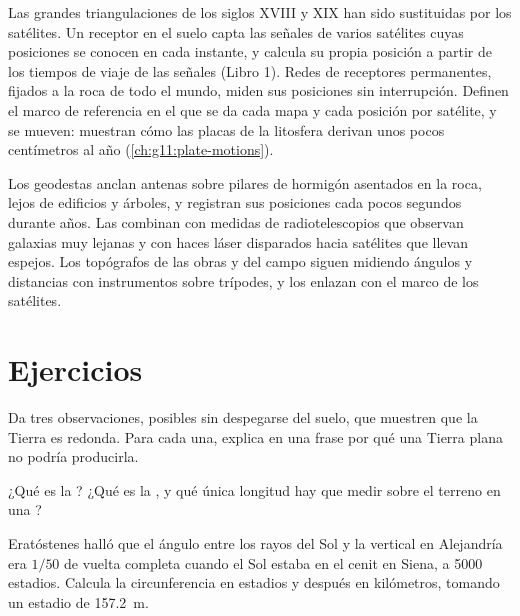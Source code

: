Las grandes triangulaciones de los siglos XVIII y XIX han sido sustituidas
por los satélites. Un receptor en el suelo capta las señales de varios
satélites cuyas posiciones se conocen en cada instante, y calcula su propia
posición a partir de los tiempos de viaje de las señales (Libro 1). Redes de
receptores permanentes, fijados a la roca de todo el mundo, miden sus
posiciones sin interrupción. Definen el marco de referencia en el que se da
cada mapa y cada posición por satélite, y se mueven: muestran cómo las
placas de la litosfera derivan unos pocos centímetros al año
(\cref{ch:g11:plate-motions}).

\begin{inthefield}
Los geodestas anclan antenas sobre pilares de hormigón asentados en la roca,
lejos de edificios y árboles, y registran sus posiciones cada pocos segundos
durante años. Las combinan con medidas de radiotelescopios que observan
galaxias muy lejanas y con haces láser disparados hacia satélites que llevan
espejos. Los topógrafos de las obras y del campo siguen midiendo ángulos y
distancias con instrumentos sobre trípodes, y los enlazan con el marco de
los satélites.
\end{inthefield}

\section{Ejercicios}

\begin{exercise}[$\star$]\label{exo:g10:measuring-the-earth:1}
Da tres observaciones, posibles sin despegarse del suelo, que muestren que
la Tierra es redonda. Para cada una, explica en una frase por qué una
Tierra plana no podría producirla.
\end{exercise}

\begin{exercise}[$\star$]\label{exo:g10:measuring-the-earth:2}
¿Qué es la ? ¿Qué es la , y qué única longitud hay que
medir sobre el terreno en una ?
\end{exercise}

\begin{exercise}[$\star$]\label{exo:g10:measuring-the-earth:3}
Eratóstenes halló que el ángulo entre los rayos del Sol y la vertical en
Alejandría era $1/50$ de vuelta completa cuando el Sol estaba en el cenit en
Siena, a 5000 estadios. Calcula la circunferencia en estadios y después en
kilómetros, tomando un estadio de \qty{157.2}{m}.
\end{exercise}

